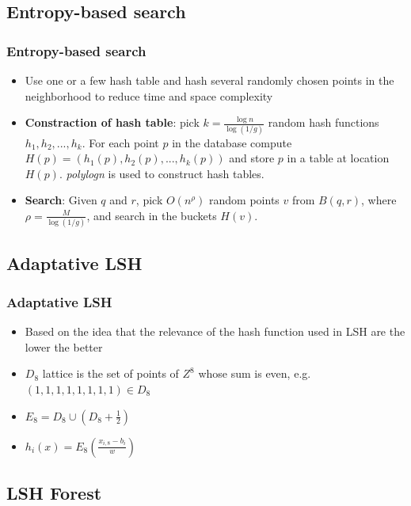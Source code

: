 \subsection{Entropy-based search}
\begin{frame}
\frametitle{Entropy-based search}
\small
\begin{itemize}
	\item Use one or a few hash table and hash several randomly chosen points in the neighborhood to reduce time and space complexity
	\vspace{2ex}
	\item  \textbf{Constraction of hash table}: pick $k=\frac{\log n}{\log (1/g)}$ random hash functions $h_1, h_2, ..., h_k$. For each point $p$ in the database compute $H(p)=(h_1(p), h_2(p), ..., h_k(p))$ and store $p$ in a table at location $H(p)$. \textit{polylogn} is used to construct hash tables.
	\vspace{2ex}
	\item \textbf{Search}: Given $q$ and $r$, pick $O(n^\rho)$ random points $v$ from $B(q, r)$, where $\rho=\frac{M}{\log(1/g)}$, and search in the buckets $H(v)$.
\end{itemize}
\end{frame}
\subsection{Adaptative LSH}
\begin{frame}
\frametitle{Adaptative LSH}
\small
\begin{itemize}
	\item Based on the idea that the relevance of the hash function used in LSH are the lower the better
	\vspace{2ex}
	\item $D_8$ lattice is the set of points of $Z^8$ whose sum is even, e.g. $(1,1,1,1,1,1,1,1)\in D_8$
	\vspace{2ex}
	\item $E_8=D_8\cup (D_8+\frac{1}{2})$
	\vspace{2ex}
	\item $h_i(x)=E_8(\frac{x_{i,8}-b_i}{w})$
\end{itemize}
\end{frame}
\subsection{LSH Forest}

